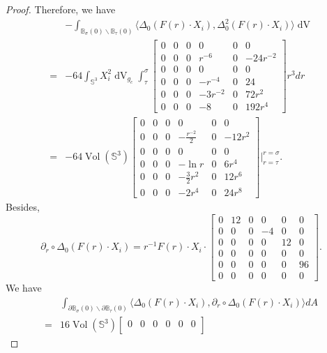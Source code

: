 \documentclass[10pt,a4paper]{amsart}
\DeclareMathOperator{\Vol}{Vol}
\DeclareMathOperator{\dvol}{dV}
\newcommand{\bB}{\mathbb{B}}
\newcommand{\bS}{\mathbb{S}}
\begin{document}
\begin{proof}
Therefore, we have
\begin{equation}
\begin{split}
    &-\int_{\bB_{\sigma}(0)\backslash \bB_{\tau}(0)}\langle \Delta_0 (F(r)\cdot X_i), \Delta^2_0(F(r)\cdot X_i)\rangle \dvol\\
=&-64\int_{\bS^3} X^2_i\dvol_{g_c}\int_{\tau}^{\sigma}\begin{bmatrix}
0 & 0 & 0 & 0 & 0& 0\\
0 & 0 & 0 & r^{-6} & 0& -24r^{-2}\\
0 & 0 & 0 & 0 & 0& 0\\
0 & 0 & 0 & -r^{-4} & 0& 24\\
0 & 0 & 0 & -3r^{-2} & 0& 72r^2\\
0 & 0 & 0 & -8 & 0 & 192r^4
\end{bmatrix}r^3dr\\
=&-64\Vol(\bS^3) \begin{bmatrix}
0 & 0 & 0 & 0 & 0& 0\\
0 & 0 & 0 & -\frac{r^{-2}}{2} & 0& -12r^2\\
0 & 0 & 0 & 0 & 0& 0\\
0 & 0 & 0 & -\ln r & 0& 6r^4\\
0 & 0 & 0 & -\frac{3}{2}r^2 & 0& 12r^6\\
0 & 0 & 0 & -2r^4 & 0 & 24r^8
\end{bmatrix}\Bigg|_{r=\tau}^{r=\sigma}.
    \end{split}
\end{equation}
Besides,
\begin{equation}
    \partial_r \circ \Delta_0(F(r)\cdot X_i)=r^{-1} F(r)\cdot X_i\cdot 
    \begin{bmatrix}
0 & 12 & 0 & 0 & 0& 0\\
0 & 0 & 0 & -4 & 0& 0\\
0 & 0 & 0 & 0 & 12& 0\\
0 & 0 & 0 & 0 & 0& 0\\
0 & 0 & 0 & 0 & 0& 96\\
0 & 0 & 0 & 0 & 0& 0
\end{bmatrix}.
\end{equation}
We have
\begin{equation}
\begin{split}
    &\int_{\partial \bB_{\sigma}(0)\backslash \partial \bB_{\tau}(0)} \langle \Delta_0(F(r)\cdot X_i), \partial_r \circ \Delta_0(F(r)\cdot X_i) \rangle dA\\
    =&16 \Vol(\bS^3) \begin{bmatrix}
0 & 0 & 0 & 0 & 0& 0\\

\end{bmatrix}
\end{split}
\end{equation}
\end{proof}
\end{document}
